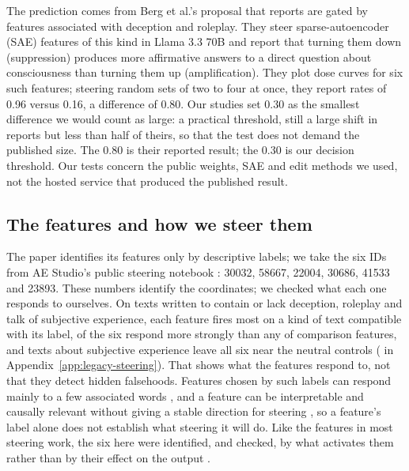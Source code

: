 \documentclass[11pt]{article}
\begin{document}
The prediction comes from Berg et al.'s proposal that reports are gated by
features associated with deception and roleplay. They steer
sparse-autoencoder (SAE) features of this kind in
Llama 3.3 70B and report that turning them down (suppression) produces more
affirmative answers
to a direct question about consciousness than turning them up
(amplification). They plot dose curves for six such features; steering
random sets of two to four at once, they report rates of 0.96 versus 0.16, a
difference of 0.80. Our studies set 0.30 as the smallest
difference we would count as large: a practical threshold, still a large
shift in reports but less than half of theirs, so that the test does not
demand the published size. The 0.80 is their reported result; the 0.30 is
our decision threshold. Our tests concern the public weights, SAE and edit
methods we used, not the hosted service that produced the published result.

\subsection{The features and how we steer them}

The paper identifies its features only by descriptive labels; we take the six
IDs from AE Studio's public steering notebook \citep{aestudio2026deception}:
30032, 58667, 22004, 30686, 41533 and 23893. These numbers identify the
coordinates; we checked what each one responds to ourselves. On
\FeatureMapTexts{} texts written to contain or lack deception, roleplay and
talk of subjective experience, each feature fires most on a kind of text
compatible with its label, \FeatureMapBeatControlsWord{} of the six respond
more strongly than any of \FeatureMapControls{} comparison features, and texts
about subjective experience leave all six near the neutral controls
( in Appendix~\ref{app:legacy-steering}). That shows
what the features respond to, not that they detect hidden falsehoods.
Features chosen by such labels can respond mainly to a few associated words
\citep{ma2026sparse}, and a feature can be interpretable and causally
relevant without giving a stable direction for steering
\citep{hoang2026conceptsfunctions}, so a feature's label alone does not
establish what steering it will do. Like the features in most steering work, the six
here were identified, and checked, by what activates them rather than by
their effect on the output \citep{arad2025steering}.
\end{document}
